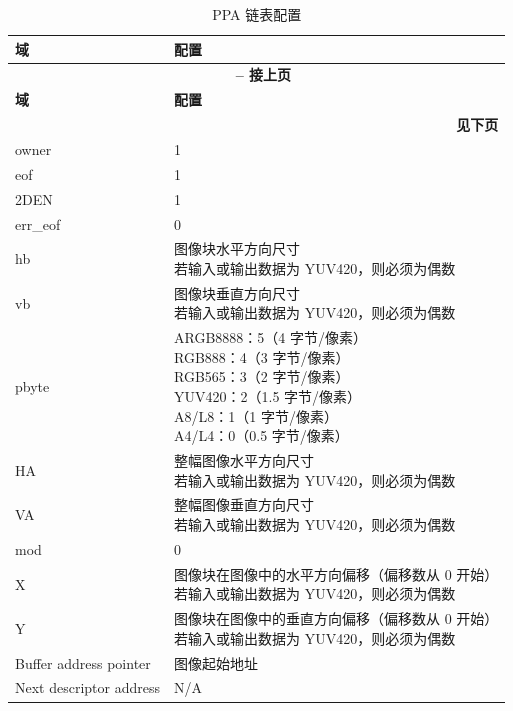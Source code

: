 \documentclass[main\_\_CN.tex]{subfiles}
\begin{document}
\begin{longtable}[c]{ |p{2.5cm}|p{8cm}| }
    \caption{PPA 链表配置}
    \label{tab:ppa_link_list_config}\\\hline

    \rowcolor{lightgray}
    \textbf{域} & \textbf{配置} \\\hline
    \endfirsthead


    \multicolumn{2}{c}{\bfseries \tablename\ \thetable{} -- 接上页}\\\hline
    \rowcolor{lightgray}
    \textbf{域} & \textbf{配置} \\\hline
    \endhead

    \multicolumn{2}{r}{\textbf{见下页}} \\
    \endfoot

    \endlastfoot

        owner & 1 \\\hline
        eof & 1 \\\hline
        2DEN & 1 \\\hline
        err\_eof & 0 \\\hline
        hb & \makecell[l]{图像块水平方向尺寸\\若输入或输出数据为 YUV420，则必须为偶数} \\\hline
        vb & \makecell[l]{图像块垂直方向尺寸\\若输入或输出数据为 YUV420，则必须为偶数} \\\hline
        pbyte & \makecell[l]{ARGB8888：5（4 字节/像素）\\RGB888：4（3 字节/像素）\\RGB565：3（2 字节/像素）\\YUV420：2（1.5 字节/像素）\\A8/L8：1（1 字节/像素）\\A4/L4：0（0.5 字节/像素）} \\\hline
        HA & \makecell[l]{整幅图像水平方向尺寸\\若输入或输出数据为 YUV420，则必须为偶数} \\\hline
        VA & \makecell[l]{整幅图像垂直方向尺寸\\若输入或输出数据为 YUV420，则必须为偶数} \\\hline
        mod & 0 \\\hline
        X & \makecell[l]{图像块在图像中的水平方向偏移（偏移数从 0 开始）\\若输入或输出数据为 YUV420，则必须为偶数} \\\hline
        Y & \makecell[l]{图像块在图像中的垂直方向偏移（偏移数从 0 开始）\\若输入或输出数据为 YUV420，则必须为偶数} \\\hline
        Buffer address pointer & 图像起始地址 \\\hline
        Next descriptor address & N/A \\\hline

\end{longtable}
\end{document}
